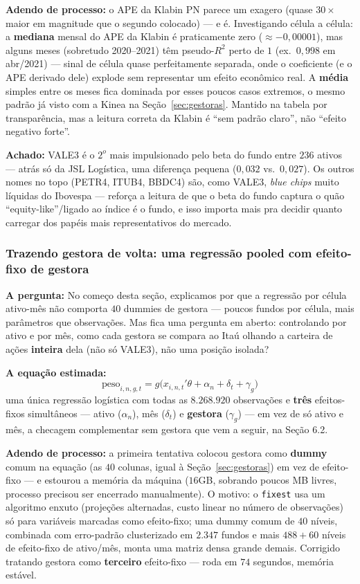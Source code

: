 \documentclass[11pt,a4paper]{article}
\newcommand{\pergunta}[1]{\par\vspace{4pt}\noindent\textbf{\color{azul}A pergunta:} #1\par\vspace{2pt}}
\newcommand{\equacao}[0]{\par\vspace{4pt}\noindent\textbf{\color{vermelho}A equação estimada:}\ }
\newcommand{\aha}[1]{\par\vspace{4pt}\noindent\textbf{\color{vermelho}Achado:} #1\par\vspace{2pt}}
\begin{document}
\textbf{Adendo de processo:} o APE da Klabin PN parece um exagero (quase $30\times$ maior em
magnitude que o segundo colocado) --- e é. Investigando célula a célula: a \textbf{mediana}
mensal do APE da Klabin é praticamente zero ($\approx-0{,}00001$), mas alguns meses (sobretudo
2020--2021) têm pseudo-$R^2$ perto de $1$ (ex.\ $0{,}998$ em abr/2021) --- sinal de célula quase
perfeitamente separada, onde o coeficiente (e o APE derivado dele) explode sem representar um
efeito econômico real. A \textbf{média} simples entre os meses fica dominada por esses poucos
casos extremos, o mesmo padrão já visto com a Kinea na Seção~\ref{sec:gestoras}. Mantido na
tabela por transparência, mas a leitura correta da Klabin é ``sem padrão claro'', não ``efeito
negativo forte''.

\aha{VALE3 é o $2^o$ mais impulsionado pelo beta do fundo entre $236$ ativos --- atrás só da
JSL Logística, uma diferença pequena ($0{,}032$ vs.\ $0{,}027$). Os outros nomes no topo (PETR4,
ITUB4, BBDC4) são, como VALE3, \emph{blue chips} muito líquidas do Ibovespa --- reforça a leitura
de que o beta do fundo captura o quão ``equity-like''/ligado ao índice é o fundo, e isso importa
mais pra decidir quanto carregar dos papéis mais representativos do mercado.}

\subsubsection*{Trazendo gestora de volta: uma regressão pooled com efeito-fixo de gestora}

\pergunta{No começo desta seção, explicamos por que a regressão por célula ativo-mês não comporta
$40$ dummies de gestora --- poucos fundos por célula, mais parâmetros que observações. Mas fica
uma pergunta em aberto: controlando por ativo e por mês, como cada gestora se compara ao Itaú
olhando a carteira de ações \textbf{inteira} dela (não só VALE3), não uma posição isolada?}

\equacao
$$\text{peso}_{i,n,g,t} = g\big(x_{i,n,t}'\theta + \alpha_n + \delta_t + \gamma_g\big)$$
uma única regressão logística com todas as $8.268.920$ observações e \textbf{três} efeitos-fixos
simultâneos --- ativo ($\alpha_n$), mês ($\delta_t$) e \textbf{gestora} ($\gamma_g$) --- em vez de
só ativo e mês, a checagem complementar sem gestora que vem a seguir, na Seção 6.2.

\textbf{Adendo de processo:} a primeira tentativa colocou gestora como \textbf{dummy} comum na
equação (as $40$ colunas, igual à Seção~\ref{sec:gestoras}) em vez de efeito-fixo --- e estourou a
memória da máquina ($16$GB, sobrando poucos MB livres, processo precisou ser encerrado
manualmente). O motivo: o \texttt{fixest} usa um algoritmo enxuto (projeções alternadas, custo
linear no número de observações) só para variáveis marcadas como efeito-fixo; uma dummy comum de
$40$ níveis, combinada com erro-padrão clusterizado em $2.347$ fundos e mais $488+60$ níveis de
efeito-fixo de ativo/mês, monta uma matriz densa grande demais. Corrigido tratando gestora como
\textbf{terceiro} efeito-fixo --- roda em $74$ segundos, memória estável.
\end{document}
